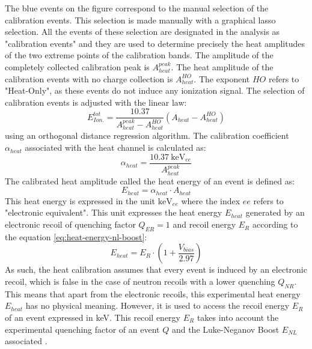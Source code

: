 The blue events on the figure correspond to the manual selection of the calibration events. This selection is made manually with a graphical lasso selection. All the events of these selection are designated in the analysis as "calibration events" and they are used to determine precisely the heat amplitudes of the two extreme points of the calibration bands. The  amplitude of the completely collected calibration peak is $A_{heat}^{peak}$. The heat amplitude of the calibration events with no charge collection is  $A_{heat}^{HO}$. The exponent $HO$ refers to "Heat-Only", as these events do not induce any ionization signal. The selection of calibration events is adjusted with the linear law:
\begin{equation}
E_{Ion.}^{tot} = \frac{10.37}{A_{heat}^{peak} - A_{heat}^{HO}} (A_{heat} - A_{heat}^{HO})
\end{equation}
using an orthogonal distance regression algorithm. The calibration coefficient $\alpha_{heat}$ associated with the heat channel is calculated as:
\begin{equation}
\alpha_{heat} = \frac{\SI{10.37}{\kilo\eV_{ee}}}{A_{heat}^{peak}}
\end{equation}
The calibrated heat amplitude called the heat energy of an event is defined as:
\begin{equation}
\label{eq:calibration-heat}
E_{heat} = \alpha_{heat} \cdot A_{heat}
\end{equation}
This heat energy is expressed in the unit $\si{\kilo\eV_{ee}}$ where the index $ee$ refers to "electronic equivalent". This unit expresses the heat energy $E_{heat}$ generated by an electronic recoil of quenching factor $Q_{ER}=1$ and recoil energy $E_R$ according to the equation \ref{eq:heat-energy-nl-boost}:
\begin{equation}
E_{heat} = E_R \cdot \left( 1 + \frac{V_{bias}}{2.97} \right)
\end{equation}
As such, the heat calibration assumes that every event is induced by an electronic recoil, which is false in the case of neutron recoils with a lower quenching $Q_{NR}$. This means that apart from the electronic recoils, this experimental heat energy $E_{heat}$ has no physical meaning. However, it is used to access the recoil energy $E_R$ of an event expressed in \si{\kilo\eV}. This recoil energy $E_R$ takes into account the experimental quenching factor of an event $Q$ and the Luke-Neganov Boost $E_{NL}$ associated . 

